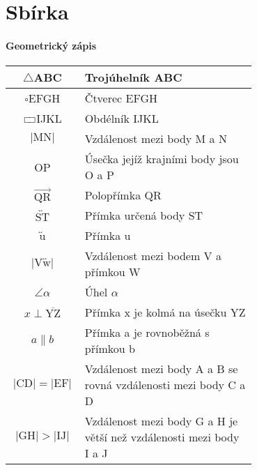 \chapter{Sbírka}

\subsubsection{Geometrický zápis}
\begin{tabular}{|c|p{0.7\linewidth}|}
    \hline
    $\triangle$ABC                                         & Trojúhelník ABC                                                     \\ \hline
    $\square$EFGH                                          & Čtverec EFGH                                                        \\ \hline
    $\rectangle$IJKL                                       & Obdélník IJKL                                                       \\ \hline
    $\lvert \text{MN} \rvert$                              & Vzdálenost mezi body M a N                                          \\ \hline
    OP                                & Úsečka jejíž krajními body jsou O a P                                                           \\ \hline
    $\overrightarrow{\text{QR}}$                           & Polopřímka QR                                                       \\ \hline
    $\overleftrightarrow{\text{ST}}$                       & Přímka určená body ST                                               \\ \hline
    $\overleftrightarrow{\text{u}}$                        & Přímka u                                                            \\ \hline
    $\lvert \text{V} \overleftrightarrow{\text{w}} \rvert$ & Vzdálenost mezi bodem V a přímkou W                                 \\ \hline
    $\angle \alpha $                                       & Úhel $\alpha$                                                       \\ \hline
    $ x \perp \overline{\text{YZ}} $                       & Přímka x je kolmá na úsečku YZ                                      \\ \hline
    $a \| b$                                               & Přímka a je rovnoběžná s přímkou b                                  \\ \hline
    $\lvert \text{CD} \rvert = \lvert \text{EF} \rvert$    & Vzdálenost mezi body A a B se rovná vzdálenosti mezi body C a D     \\ \hline
    $\lvert \text{GH} \rvert > \lvert \text{IJ} \rvert$    & Vzdálenost mezi body G a H je větší než vzdálenosti mezi body I a J \\ \hline
\end{tabular}

\newpage
